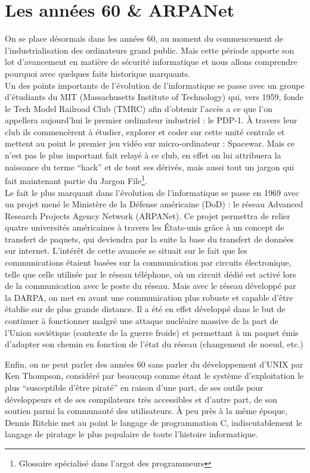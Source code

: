 \documentclass[a4paper]{memoir}
\begin{document}
\section{Les années 60 \& ARPANet}

On se place désormais dans les années 60, au moment du commencement de l'industrialisation des ordinateurs grand public. Mais cette période apporte son lot d'avancement en matière de sécurité informatique et nous allons comprendre pourquoi avec quelques faits historique marquants.\\

Un des points importants de l'évolution de l'informatique se passe avec un groupe d'étudiants du MIT (Massachusetts Institute of Technology) qui, vers 1959, fonde le Tech Model Railroad Club (TMRC) afin d'obtenir l'accès a ce que l'on appellera aujourd'hui le premier ordinateur industriel : le PDP-1. À travers leur club ils commencèrent à étudier, explorer et coder sur cette unité centrale et mettent au point le premier jeu vidéo sur micro-ordinateur : Spacewar. Mais ce n'est pas le plus important fait relayé à ce club, en effet on lui attribuera la naissance du terme ``hack'' et de tout ses dérivés, mais aussi tout un jargon qui fait maintenant partie du Jargon File\footnote{Glossaire spécialisé dans l'argot des programmeurs}.\\

Le fait le plus marquant dans l'évolution de l'informatique se passe en 1969 avec un projet mené le Ministère de la Défense américaine (DoD) : le réseau Advanced Research Projects Agency Network (ARPANet). Ce projet permettra de relier quatre universités américaines à travers les États-unis grâce à un concept de transfert de paquets, qui deviendra par la suite la base du transfert de données sur internet. L'intérêt de cette avancée se situait sur le fait que les communications étaient basées sur la communication par circuits électronique, telle que celle utilisée par le réseau téléphone, où un circuit dédié est activé lors de la communication avec le poste du réseau. Mais avec le réseau développé par la DARPA, on met en avant une communication plus robuste et capable d'être établie sur de plus grande distance. Il a été en effet développé dans le but de continuer à fonctionner malgré une attaque nucléaire massive de la part de l'Union soviétique (contexte de la guerre froide) et permettant à un paquet émis d'adapter son chemin en fonction de l'état du réseau (changement de noeud, etc.)

Enfin, on ne peut parler des années 60 sans parler du développement d'UNIX par Ken Thompson, considéré par beaucoup comme étant le système d'exploitation le plus ``susceptible d'être piraté'' en raison d'une part, de ses outils pour développeurs et de ses compilateurs très accessibles et d'autre part, de son soutien parmi la communauté des utilisateurs. À peu près à la même époque, Dennis Ritchie met au point le langage de programmation C, indiscutablement le langage de piratage le plus populaire de toute l'histoire informatique.\\
\end{document}

